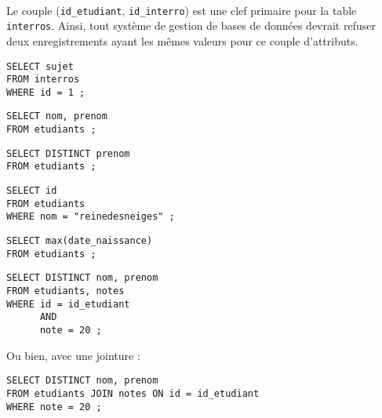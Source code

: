 \setcounter{numques}{0}~\\


\question{} Le couple (\texttt{id\_etudiant}, \texttt{id\_interro}) est une clef primaire pour la table \texttt{interros}. 
  Ainsi, tout système de gestion de bases de données devrait refuser deux enregistrements ayant les mêmes valeurs pour ce couple d'attributs. 
  
  
\medskip{}  
  
\question{}
\begin{lstlisting}
SELECT sujet
FROM interros
WHERE id = 1 ;
\end{lstlisting}

  
\medskip{}  
  
\question{}
\begin{lstlisting}
SELECT nom, prenom
FROM etudiants ;
\end{lstlisting}
  
\medskip{}  
  
\question{}
\begin{lstlisting}
SELECT DISTINCT prenom
FROM etudiants ;
\end{lstlisting}
  
\medskip{}  
  
\question{}
\begin{lstlisting}
SELECT id
FROM etudiants
WHERE nom = "reinedesneiges" ;
\end{lstlisting}
  
\medskip{}  
  
\question{}
\begin{lstlisting}
SELECT max(date_naissance)
FROM etudiants ;
\end{lstlisting}
  
\medskip{}  
  
\question{}
\begin{lstlisting}
SELECT DISTINCT nom, prenom
FROM etudiants, notes 
WHERE id = id_etudiant
      AND
      note = 20 ;
\end{lstlisting}
Ou bien, avec une jointure : 
\begin{lstlisting}
SELECT DISTINCT nom, prenom
FROM etudiants JOIN notes ON id = id_etudiant
WHERE note = 20 ;
\end{lstlisting}

\medskip{}  
  
\question{}

